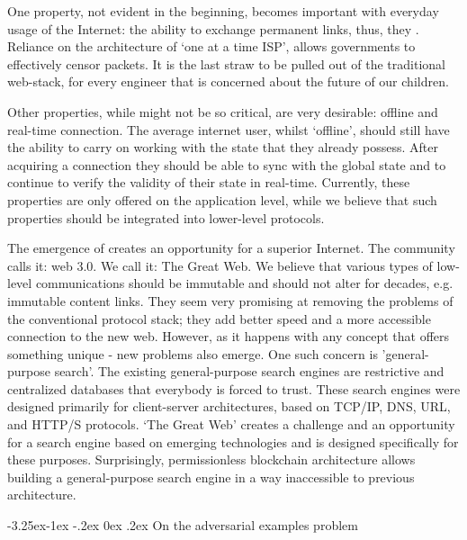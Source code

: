 \documentclass[8pt,oneside]{amsart}
\makeatletter
\newcommand{\linkgreen}[2]{\href{#1}{\color{green}{#2}}}
\renewcommand\subsection{\@startsection{subsection}{2}{\z@}%
                                     {-3.25ex\@plus -1ex \@minus -.2ex}%
                                     {0ex \@plus .2ex}%
                                     {\play\Large}}%
\newcommand{\titleSection}[1]{\subsection{#1}}
\makeatother
\begin{document}
\begin{Abstract}
One property, not evident in the beginning, becomes important with everyday usage of the Internet: the ability to exchange permanent links, thus, they \linkgreen{https://ipfs.io/ipfs/QmNhaUrhM7KcWzFYdBeyskoNyihrpHvUEBQnaddwPZigcN}{would not break after time had passed}. Reliance on the architecture of ‘one at a time ISP’, allows governments to effectively censor packets. It is the last straw to be pulled out of the traditional web-stack, for every engineer that is concerned about the future of our children.

Other properties, while might not be so critical, are very desirable: offline and real-time connection. The average internet user, whilst ‘offline’, should still have the ability to carry on working with the state that they already possess. After acquiring a connection they should be able to sync with the global state and to continue to verify the validity of their state in real-time. Currently, these properties are only offered on the application level, while we believe that such properties should be integrated into lower-level protocols.

The emergence of \linkgreen{https://ipfs.io/ipfs/Qmf3eHU9idMUZgx6MKhCsFPWL24X9pDUi2ECqyH8UtBAMQ}{a brand-new web-stack} creates an opportunity for a superior Internet. The community calls it: web 3.0. We call it: The Great Web. We believe that various types of low-level communications should be immutable and should not alter for decades, e.g. immutable content links. They seem very promising at removing the problems of the conventional protocol stack; they add better speed and a more accessible connection to the new web. However, as it happens with any concept that offers something unique - new problems also emerge. One such concern is 'general-purpose search'. The existing general-purpose search engines are restrictive and centralized databases that everybody is forced to trust. These search engines were designed primarily for client-server architectures, based on TCP/IP, DNS, URL, and HTTP/S protocols. ‘The Great Web’ creates a challenge and an opportunity for a search engine based on emerging technologies and is designed specifically for these purposes. Surprisingly, permissionless blockchain architecture allows building a general-purpose search engine in a way inaccessible to previous architecture.

\titleSection{On the adversarial examples problem}\label{On the adversarial examples problem}


\end{Abstract}
\end{document}
